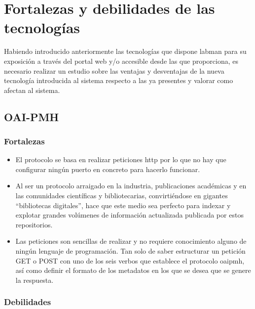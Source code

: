 \section{Fortalezas y debilidades de las tecnologías}

Habiendo introducido anteriormente las tecnologías que dispone \acrshort{labman} para su exposición a través del portal web y/o accesible desde las  que proporciona, es necesario realizar un estudio sobre las ventajas y desventajas de la nueva tecnología introducida al sistema respecto a las ya presentes y valorar como afectan al sistema.

\subsection{OAI-PMH}

\subsubsection{Fortalezas}

\begin{itemize}
	\item El protocolo se basa en realizar peticiones \acrshort{http} por lo que no hay que configurar ningún puerto en concreto para hacerlo funcionar.

	\item Al ser un protocolo arraigado en la industria, publicaciones académicas y en las comunidades científicas y bibliotecarias, convirtiéndose en gigantes ``bibliotecas digitales'', hace que este medio sea perfecto para indexar y explotar grandes volúmenes de información actualizada publicada por estos repositorios.

	\item Las peticiones son sencillas de realizar y no requiere conocimiento alguno de ningún lenguaje de programación. Tan solo de saber estructurar un petición GET o POST con uno de los seis verbos que establece el protocolo \acrshort{oaipmh}, así como definir el formato de los metadatos en los que se desea que se genere la respuesta.
\end{itemize}

\subsubsection{Debilidades}

